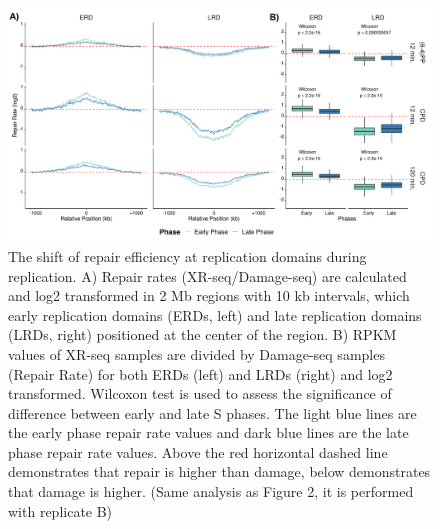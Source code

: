 \begin{figure}[H]
\begin{center}
\includegraphics[width=\textwidth]{Chapters/7_appendix/figures/supfig10}
\caption[The shift of repair efficiency at replication domains during replication.]{The shift of repair efficiency at replication domains during replication. A) Repair rates (XR-seq/Damage-seq) are calculated and log2 transformed in 2 Mb regions with 10 kb intervals, which early replication domains (ERDs, left) and late replication domains (LRDs, right) positioned at the center of the region. B) RPKM values of XR-seq samples are divided by Damage-seq samples (Repair Rate) for both ERDs (left) and LRDs (right) and log2 transformed. Wilcoxon test is used to assess the significance of difference between early and late S phases. The light blue lines are the early phase repair rate values and dark blue lines are the late phase repair rate values. Above the red horizontal dashed line demonstrates that repair is higher than damage, below demonstrates that damage is higher. (Same analysis as Figure 2, it is performed with replicate B)}
\label{supfig:repdomain}
\end{center}
\end{figure}

